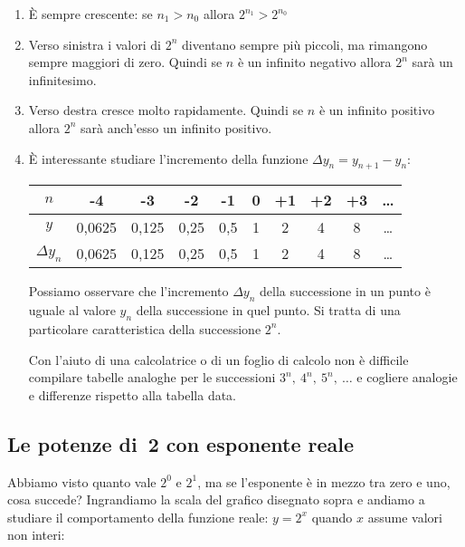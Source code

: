 \begin{enumerate}
 \item 
  È sempre crescente: se \(n_1 > n_0\) allora \(2^{n_1} > 2^{n_0}\)
 \item 
  Verso sinistra i valori di \(2^n\) diventano sempre più piccoli, ma 
rimangono 
  sempre maggiori di zero. Quindi se \(n\) è un infinito negativo 
  allora \(2^n\) sarà un infinitesimo.
 \item 
  Verso destra cresce molto rapidamente. Quindi se \(n\) è un infinito 
positivo 
  allora \(2^n\) sarà anch'esso un infinito positivo.
 \item 
È interessante studiare l'incremento della funzione \;\(\Delta y_n = 
y_{n+1}-y_n\):
\begin{center}
\renewcommand\arraystretch{1.8}
\begin{tabular}{c|ccccccccc}
\(n\) & -4    & -3    & -2   & -1  & 0 & +1 & +2 & +3  & \dots \\
\hline 
\(y\) & 0,0625 & 0,125 & 0,25 & 0,5 & 1 & 2  & 4  & 8 & \dots\\
\hline
\(\Delta y_n\) & 
  0,0625 & 0,125 & 0,25 & 0,5 & 1 & 2  & 4  & 8& \dots \\
\end{tabular}
\end{center}

Possiamo osservare che l'incremento \(\Delta y_n\) della successione 
in un punto è uguale al valore \(y_n\) della successione in quel punto. 
Si tratta di una particolare caratteristica della successione \(2^n\).

Con l'aiuto di una calcolatrice o di un foglio di calcolo non è difficile 
compilare tabelle analoghe per le successioni \(3^n,\ 4^n,\ 5^n,\ \dots\) e 
cogliere analogie e differenze rispetto alla tabella data.

\end{enumerate}

\subsection{Le potenze di~2 con esponente reale}
\label{subsec:esplog_potdue}

Abbiamo visto quanto vale \(2^0\) e \(2^1\), ma se l'esponente è in mezzo 
tra zero e uno, cosa succede? Ingrandiamo la scala del grafico disegnato 
sopra 
e andiamo a studiare il comportamento della funzione reale: \(y=2^x\) 
quando 
\(x\) assume valori non interi:

